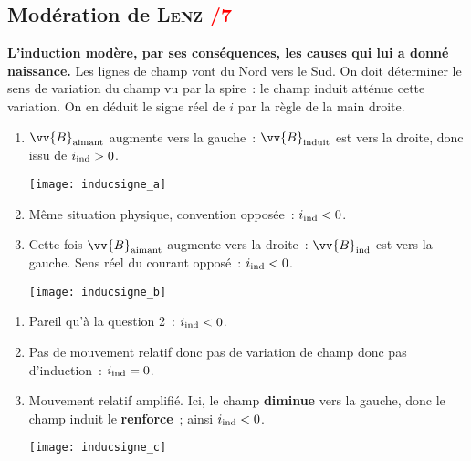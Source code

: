 \documentclass[11pt]{book}
\begin{document}
{	\subsection{Modération de \textsc{Lenz} \hfill \textcolor{red}{/7}}
	\label{ssec:lenz}
	\begin{enumerate}
		 \textbf{L'induction modère, par ses conséquences, les causes qui
			lui a donné naissance.}
		 Les lignes de champ vont du Nord vers le Sud. On doit déterminer
		le sens de variation du champ vu par la spire~: le champ induit atténue
		cette variation. On en déduit le signe réel de $i$ par la règle de la main
		droite.
		\smallbreak
		\begin{minipage}[t]{.45\linewidth}
			\begin{enumerate}
				\item $\vv{B}_{\rm aimant}$ augmente vers la gauche~: $\vv{B}_{\rm
						      induit}$ est vers la droite, donc issu de $i_{\rm ind} > 0$.
				      \begin{center}
					      \texttt{[image: inducsigne\_a]}
					      \label{fig:indsa}
				      \end{center}
				\item Même situation physique, convention opposée~: $i_{\rm ind} < 0$.
				\item Cette fois $\vv{B}_{\rm aimant}$ augmente vers la droite~:
				      $\vv{B}_{\rm ind}$ est vers la gauche. Sens réel du courant opposé~:
				      $i_{\rm ind} < 0$.
				      \begin{center}
					      \texttt{[image: inducsigne\_b]}
					      \label{fig:indsb}
				      \end{center}
			\end{enumerate}
		\end{minipage}
		\hfill
		\begin{minipage}[t]{.45\linewidth}
			\begin{enumerate}[start=4]
				\item Pareil qu'à la question 2~: $i_{\rm ind} < 0$.
				\item Pas de mouvement relatif donc pas de variation de champ donc pas
				      d'induction~: $i_{\rm ind} = 0$.
				\item Mouvement relatif amplifié. Ici, le champ \textbf{diminue} vers la
				      gauche, donc le champ induit le \textbf{renforce}~; ainsi $i_{\rm
							      ind} < 0$.
				      \begin{center}
					      \texttt{[image: inducsigne\_c]}
					      \label{fig:indsc}
				      \end{center}
			\end{enumerate}
		\end{minipage}
	\end{enumerate}
}
\end{document}
